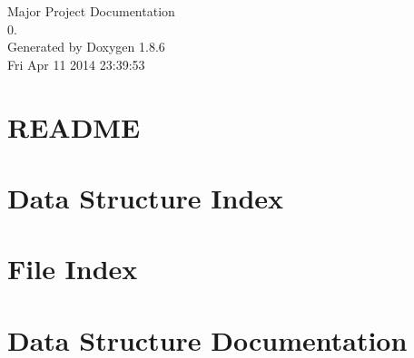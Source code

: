 \documentclass[twoside]{book}
\newcommand{\clearemptydoublepage}{%
  \newpage{\pagestyle{empty}\cleardoublepage}%
}
\begin{document}
\begin{titlepage}
\vspace*{7cm}
\begin{center}%
{\Large Major Project Documentation \\[1ex]\large 0. }\\
\vspace*{1cm}
{\large Generated by Doxygen 1.8.6}\\
\vspace*{0.5cm}
{\small Fri Apr 11 2014 23:39:53}\\
\end{center}
\end{titlepage}
\clearemptydoublepage
\tableofcontents
\clearemptydoublepage
{}

\chapter{R\-E\-A\-D\-M\-E}
\label{md__c_1__users__stefan__documents__git_hub__final__project__r_e_a_d_m_e}

\chapter{Data Structure Index}

\chapter{File Index}

\chapter{Data Structure Documentation}


\end{document}
